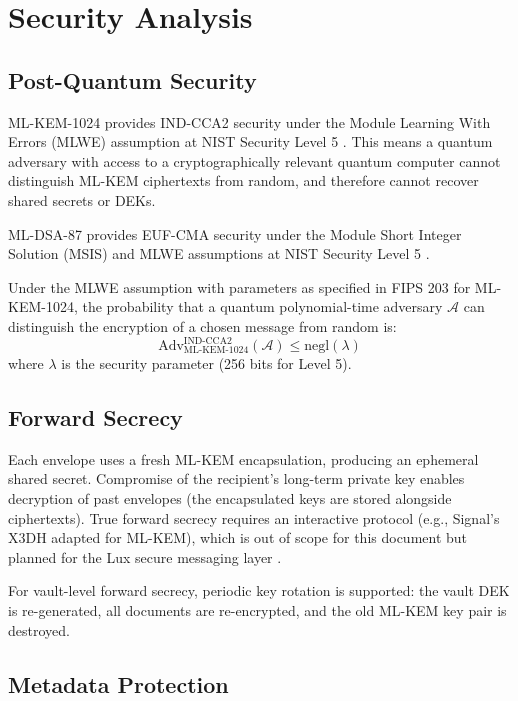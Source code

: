 \section{Security Analysis}

\label{sec:security}

\subsection{Post-Quantum Security}

ML-KEM-1024 provides IND-CCA2 security under the Module Learning With
Errors (MLWE) assumption at NIST Security Level 5 \cite{fips203}.  This
means a quantum adversary with access to a cryptographically relevant
quantum computer cannot distinguish ML-KEM ciphertexts from random, and
therefore cannot recover shared secrets or DEKs.

ML-DSA-87 provides EUF-CMA security under the Module Short Integer
Solution (MSIS) and MLWE assumptions at NIST Security Level 5 \cite{fips204}.

\begin{theorem}
Under the MLWE assumption with parameters as specified in FIPS 203 for
ML-KEM-1024, the probability that a quantum polynomial-time adversary
$\mathcal{A}$ can distinguish the encryption of a chosen message from
random is:
\[
  \text{Adv}^{\text{IND-CCA2}}_{\text{ML-KEM-1024}}(\mathcal{A}) \leq \text{negl}(\lambda)
\]
where $\lambda$ is the security parameter (256 bits for Level 5).
\end{theorem}

\subsection{Forward Secrecy}

Each envelope uses a fresh ML-KEM encapsulation, producing an ephemeral
shared secret.  Compromise of the recipient's long-term private key
enables decryption of past envelopes (the encapsulated keys are stored
alongside ciphertexts).  True forward secrecy requires an interactive
protocol (e.g., Signal's X3DH adapted for ML-KEM), which is out of
scope for this document but planned for the Lux secure messaging layer
\cite{lux-messaging}.

For vault-level forward secrecy, periodic key rotation is supported:
the vault DEK is re-generated, all documents are re-encrypted, and the
old ML-KEM key pair is destroyed.

\subsection{Metadata Protection}

